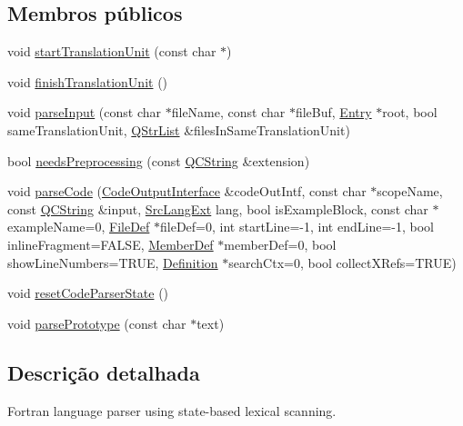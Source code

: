 \subsection*{Membros públicos}
\begin{DoxyCompactItemize}
\item 
void \hyperlink{class_fortran_language_scanner_a9179d0b9461d5d683468fb6015d1643f}{start\-Translation\-Unit} (const char $\ast$)
\item 
void \hyperlink{class_fortran_language_scanner_a245c1fbfb8ba359e61d832c4e7c6c98e}{finish\-Translation\-Unit} ()
\item 
void \hyperlink{class_fortran_language_scanner_ab1ed2c75b61719cec6060b9f69419743}{parse\-Input} (const char $\ast$file\-Name, const char $\ast$file\-Buf, \hyperlink{class_entry}{Entry} $\ast$root, bool same\-Translation\-Unit, \hyperlink{class_q_str_list}{Q\-Str\-List} \&files\-In\-Same\-Translation\-Unit)
\item 
bool \hyperlink{class_fortran_language_scanner_ac49a959c40c82385233e4c75163e39ae}{needs\-Preprocessing} (const \hyperlink{class_q_c_string}{Q\-C\-String} \&extension)
\item 
void \hyperlink{class_fortran_language_scanner_ac614074ea2c569cabd265a6168ad36d2}{parse\-Code} (\hyperlink{class_code_output_interface}{Code\-Output\-Interface} \&code\-Out\-Intf, const char $\ast$scope\-Name, const \hyperlink{class_q_c_string}{Q\-C\-String} \&input, \hyperlink{types_8h_a9974623ce72fc23df5d64426b9178bf2}{Src\-Lang\-Ext} lang, bool is\-Example\-Block, const char $\ast$example\-Name=0, \hyperlink{class_file_def}{File\-Def} $\ast$file\-Def=0, int start\-Line=-\/1, int end\-Line=-\/1, bool inline\-Fragment=F\-A\-L\-S\-E, \hyperlink{class_member_def}{Member\-Def} $\ast$member\-Def=0, bool show\-Line\-Numbers=T\-R\-U\-E, \hyperlink{class_definition}{Definition} $\ast$search\-Ctx=0, bool collect\-X\-Refs=T\-R\-U\-E)
\item 
void \hyperlink{class_fortran_language_scanner_a5d8e0ded4118b6eff98aa23eb64db02c}{reset\-Code\-Parser\-State} ()
\item 
void \hyperlink{class_fortran_language_scanner_a022344e4fa95056a941a9e8c02334872}{parse\-Prototype} (const char $\ast$text)
\end{DoxyCompactItemize}


\subsection{Descrição detalhada}
Fortran language parser using state-\/based lexical scanning. 

